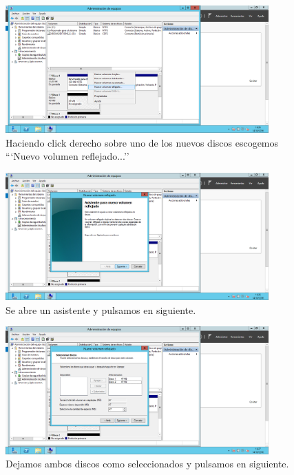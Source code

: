 {\begin{figure}[H]
	\centering
	\includegraphics[width=0.9\textwidth]{raid1-2.png}
	\caption{Haciendo click derecho sobre uno de los nuevos discos escogemos ```Nuevo volumen reflejado...''}
\end{figure}
	
\begin{figure}[H]
	\centering
	\includegraphics[width=0.9\textwidth]{raid1-3.png} 
	\caption{Se abre un asistente y pulsamos en siguiente.}
	
\end{figure}

\begin{figure}[H]
	\centering
	\includegraphics[width=0.9\textwidth]{raid1-4.png}
	\caption{Dejamos ambos discos como seleccionados y pulsamos en siguiente.}
\end{figure}

}
